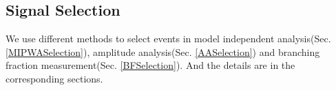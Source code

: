\subsection{Signal Selection}
\par{


    We use different methods to select events in model independent analysis(Sec. \ref{MIPWASelection}), amplitude analysis(Sec. \ref{AASelection}) and branching fraction measurement(Sec. \ref{BFSelection}).
And the details are in the corresponding sections.
}




